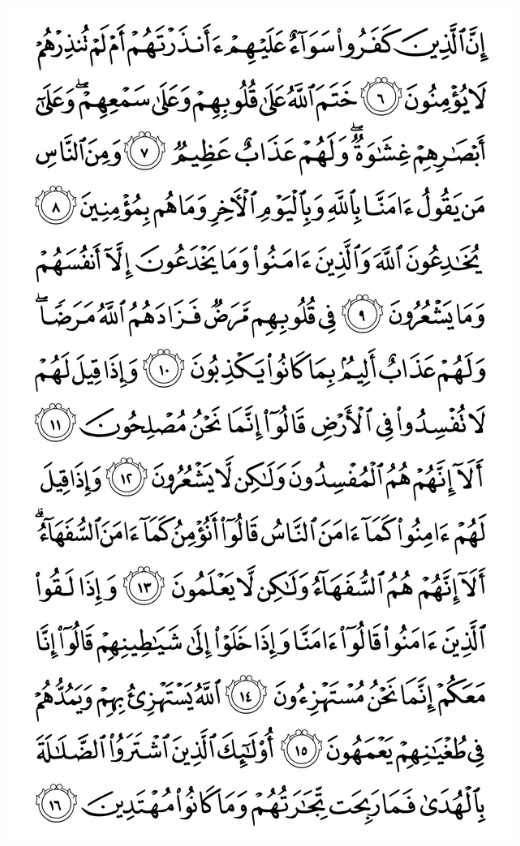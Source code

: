 \documentclass[10pt]{article}
\begin{document}
\begin{center}
\includegraphics[width=\textwidth,height=\textheight,keepaspectratio]{images/003.png}\newpage

\end{center}
\end{document}
